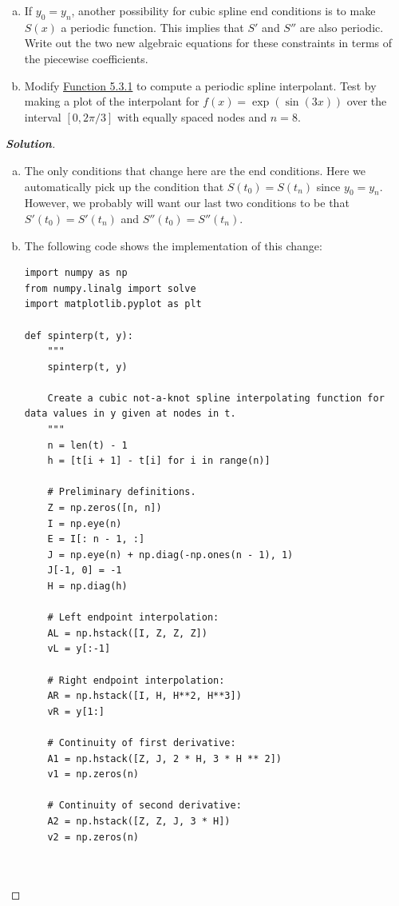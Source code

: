 \documentclass[11pt]{article}
\newenvironment{problem}[2][Question]{\begin{trivlist}
\item[\hskip \labelsep {\bfseries #1}\hskip \labelsep {\bfseries #2.}]}{\end{trivlist}}
\newenvironment{solution}{%
  \begin{proof}[\textbf{Solution}]$ $\par\nobreak\ignorespaces
}{%
  \end{proof}
}
\theoremstyle{definition}
\begin{document}
\begin{problem}{5.3.5}
\begin{enumerate}[(a)]
    \item If $y_0 = y_n$, another possibility for cubic spline end conditions is to make $S(x)$ a periodic function. This implies that $S'$ and $S''$ are also periodic. Write out the two new algebraic equations for these constraints in terms of the piecewise coefficients.
    \item Modify \href{https://fncbook.com/splines/#function-spinterp}{Function 5.3.1} to compute a periodic spline interpolant. Test by making a plot of the interpolant for $f(x) = \exp(\sin(3x))$ over the interval $[0, 2\pi/3]$ with equally spaced nodes and $n = 8$.
\end{enumerate}
\end{problem}
\begin{solution}
\begin{enumerate}[(a)]
    \item The only conditions that change here are the end conditions. Here we automatically pick up the condition that $S(t_0) = S(t_n)$ since $y_0 = y_n$. However, we probably will want our last two conditions to be that $S'(t_0) = S'(t_n)$ and $S''(t_0) = S''(t_n)$.
    \item The following code shows the implementation of this change:
\begin{lstlisting}
import numpy as np
from numpy.linalg import solve
import matplotlib.pyplot as plt

def spinterp(t, y):
    """
    spinterp(t, y)

    Create a cubic not-a-knot spline interpolating function for data values in y given at nodes in t.
    """
    n = len(t) - 1
    h = [t[i + 1] - t[i] for i in range(n)]

    # Preliminary definitions.
    Z = np.zeros([n, n])
    I = np.eye(n)
    E = I[: n - 1, :]
    J = np.eye(n) + np.diag(-np.ones(n - 1), 1)
    J[-1, 0] = -1
    H = np.diag(h)

    # Left endpoint interpolation:
    AL = np.hstack([I, Z, Z, Z])
    vL = y[:-1]

    # Right endpoint interpolation:
    AR = np.hstack([I, H, H**2, H**3])
    vR = y[1:]

    # Continuity of first derivative:
    A1 = np.hstack([Z, J, 2 * H, 3 * H ** 2])
    v1 = np.zeros(n)

    # Continuity of second derivative:
    A2 = np.hstack([Z, Z, J, 3 * H])
    v2 = np.zeros(n)



\end{lstlisting}
\end{enumerate}
\end{solution}
\end{document}

